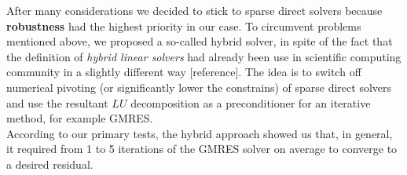 After many considerations we decided to stick to sparse direct solvers because \textbf{robustness} had the highest priority in our case. To circumvent problems mentioned above, we proposed a so-called hybrid solver, in spite of the fact that the definition of \textit{hybrid linear solvers} had already been use in scientific computing community in a slightly different way [reference]. The idea is to switch off numerical pivoting (or significantly lower the constrains) of sparse direct solvers and use the resultant $LU$ decomposition as a preconditioner for an iterative method, for example GMRES.\\


According to our primary tests, the hybrid approach showed us that, in general, it required from 1 to 5 iterations of the GMRES solver on average to converge to a desired residual.\\
